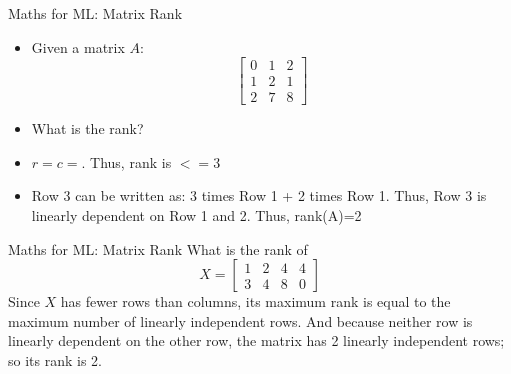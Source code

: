 \documentclass{beamer}
\begin{document}
\begin{frame}{Maths for ML: Matrix Rank}
\begin{itemize}[<+-> ] 
\item Given a matrix $A$:$$
\left[\begin{array}{lll}
	{0} & {1} & {2} \\
	{1} & {2} & {1} \\
	{2} & {7} & {8}
\end{array}\right]
$$
\item What is the rank?
\item $r=c=$. Thus, rank is $<=3$
\item Row 3 can be written as: 3 times Row 1 + 2 times Row 1. Thus, Row 3 is linearly dependent on Row 1 and 2. Thus, rank(A)=2
\end{itemize}
\end{frame}


\begin{frame}{Maths for ML: Matrix Rank}
What is the rank of
\begin{equation*}
 X=\left[\begin{array}{llll}
{1} & {2} & {4} & {4} \\
{3} & {4} & {8} & {0}
\end{array}\right]
\end{equation*}
\pause Since $X$ has fewer rows than columns, its maximum rank is equal to the maximum number of linearly independent rows. And because neither row is linearly dependent on the other row, the matrix has 2 linearly independent rows; so its rank is 2.
\end{frame}
\end{document}
